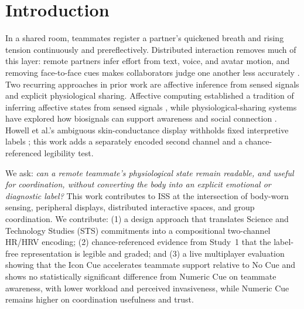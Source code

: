 \documentclass[sigconf]{acmart}
\begin{document}
\maketitle

\section{Introduction}
In a shared room, teammates register a partner's quickened breath and rising tension continuously and prereflectively. Distributed interaction removes much of this layer: remote partners infer effort from text, voice, and avatar motion, and removing face-to-face cues makes collaborators judge one another less accurately \cite{tan_role_2014}. Two recurring approaches in prior work are affective inference from sensed signals and explicit physiological sharing. Affective computing established a tradition of inferring affective states from sensed signals \cite{picard_affective_1997}, while physiological-sharing systems have explored how biosignals can support awareness and social connection \cite{hassib_heartchat_2017}. Howell et al.'s ambiguous skin-conductance display withholds fixed interpretive labels \cite{howell_biosignals_2016}; this work adds a separately encoded second channel and a chance-referenced legibility test.

We ask: \emph{can a remote teammate's physiological state remain readable, and useful for coordination, without converting the body into an explicit emotional or diagnostic label?} This work contributes to ISS at the intersection of body-worn sensing, peripheral displays, distributed interactive spaces, and group coordination. We contribute: (1) a design approach that translates Science and Technology Studies (STS) commitments into a compositional two-channel HR/HRV encoding; (2) chance-referenced evidence from Study~1 that the label-free representation is legible and graded; and (3) a live multiplayer evaluation showing that the Icon Cue accelerates teammate support relative to No Cue and shows no statistically significant difference from Numeric Cue on teammate awareness, with lower workload and perceived invasiveness, while Numeric Cue remains higher on coordination usefulness and trust.

\end{document}
